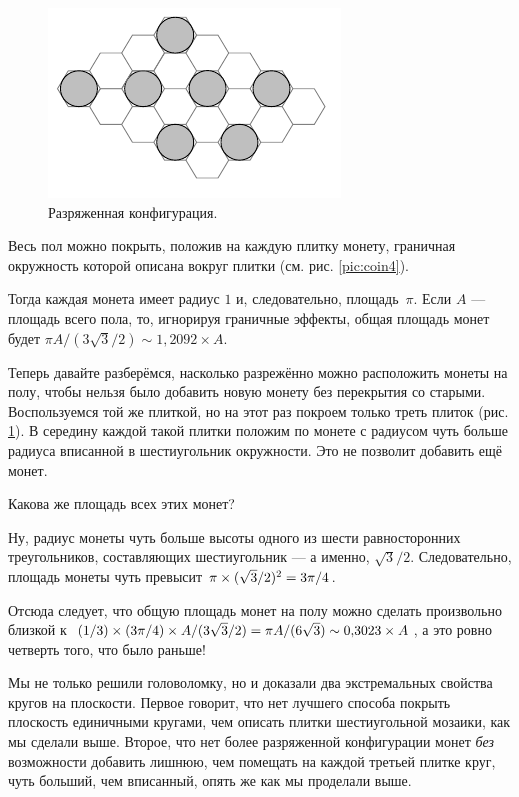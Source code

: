 \begin{figure}[b!]
\centering
\includegraphics[scale=1]{pics/coin5}
\caption{Разряженная конфигурация.}
\label{pic:coin5}
\end{figure}

Весь пол можно покрыть, положив на каждую плитку монету, граничная окружность которой описана вокруг плитки (см. рис. \ref{pic:coin4}).

Тогда каждая монета имеет радиус $1$ и, следовательно, площадь~$\pi$.
Если $A$ --- площадь всего пола, то, игнорируя граничные эффекты, общая площадь монет будет $\pi A/(3\sqrt{3}/2)\sim 1{,}2092\times A$.

Теперь давайте разберёмся, насколько разрежённо можно расположить монеты на полу, чтобы нельзя было добавить новую монету без перекрытия со старыми.
Воспользуемся той же плиткой, но на этот раз покроем только треть плиток (рис. \ref{pic:coin5}).
В середину каждой такой плитки положим по монете с радиусом чуть больше радиуса вписанной в шестиугольник окружности. 
Это не позволит добавить ещё монет.

Какова же площадь всех этих монет?

Ну, радиус монеты чуть больше высоты одного из шести равносторонних треугольников, составляющих шестиугольник — а именно, $\sqrt{3}/2$.
Следовательно, площадь монеты чуть превысит $\pi \z\times (\sqrt{3}/2)^2 \z= 3\pi/4$.

Отсюда следует, что общую площадь монет на полу можно сделать произвольно близкой к $(1/3) \times (3\pi/4) \times A/(3\sqrt{3}/2) = \pi A/(6 \sqrt{3}) \z\sim 0{,}3023 \times A$, а это ровно четверть того, что было раньше!

\medskip

Мы не только решили головоломку, но и доказали два экстремальных свойства кругов на плоскости.
Первое говорит, что нет лучшего способа покрыть плоскость единичными кругами, чем описать плитки шестиугольной мозаики, как мы сделали выше.
Второе, что нет более разряженной конфигурации монет \emph{без} возможности добавить лишнюю, чем помещать на каждой третьей плитке круг, чуть больший, чем вписанный, опять же как мы проделали выше.

